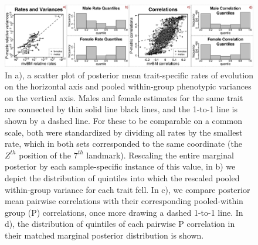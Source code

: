 \begin{figure}[h]
\centering
\includegraphics[width=160mm]{figures/harvati_figure5_final.pdf}
\caption[Evaluating Cheverud's Conjecture: Does an Inferred Rate Matrix Resemble Within-Group Patterns of Variation and Covariation?]{In a), a scatter plot of posterior mean trait-specific rates of evolution on the horizontal axis and pooled within-group phenotypic variances on the vertical axis. Males and female estimates for the same trait are connected by thin solid line black lines, and the 1-to-1 line is shown by a dashed line. For these to be comparable on a common scale, both were standardized by dividing all rates by the smallest rate, which in both sets corresponded to the same coordinate (the $Z^{th}$ position of the $7^{th}$ landmark). Rescaling the entire marginal posterior by each sample-specific instance of this value, in b) we depict the distribution of quintiles into which the rescaled pooled within-group variance for each trait fell. In c), we compare posterior mean pairwise correlations with their corresponding pooled-within group (P) correlations, once more drawing a dashed 1-to-1 line. In d), the distribution of quintiles of each pairwise P correlation in their matched marginal posterior distribution is shown.  \label{overflow}
\label{fig:harvatiFigure5}}
\end{figure}

